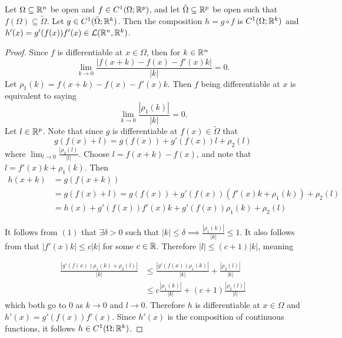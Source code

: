 \documentclass[../main.tex]{subfiles}
\begin{document}
\begin{theorem}
    \label{thm:chainrule}
    Let $\Omega \subseteq \mathbb{R}^n$ be open and $f \in C^1(\Omega; \mathbb{R}^p)$, and let $\tilde{\Omega} \subseteq \mathbb{R}^p$ be open such that $f(\Omega) \subseteq \tilde{\Omega}$. Let $g \in C^1(\tilde{\Omega}; \mathbb{R}^k)$. Then the composition $h = g \circ f$ is $C^1(\Omega; \mathbb{R}^k)$ and $h'(x) = g'(f(x)) f'(x) \in \mathcal{L}(\mathbb{R}^n, \mathbb{R}^k)$.
\end{theorem}

\begin{proof}
    Since $f$ is differentiable at $x \in \Omega$, then for $k \in \mathbb{R}^n$
    \[
        \lim_{k \to 0} \frac{|f(x+k) - f(x) - f'(x) k|}{|k|} = 0
    .\]
    Let $\rho_1(k) = f(x + k) - f(x) - f'(x) k$. Then $f$ being differentiable at $x$ is equivalent to saying
    \[
        \lim_{k \to 0} \frac{|\rho_1(k)|}{|k|} = 0 \tag{1}
    .\]
    Let $l \in \mathbb{R}^p$. Note that since $g$ is differentiable at $f(x) \in \tilde{\Omega}$ that
    \[
        g(f(x) + l) = g(f(x)) + g'(f(x)) l + \rho_2(l)
    \]
    where $\lim_{l \to 0} \frac{|\rho_2(l)}{|l|}$. Choose $l = f(x+k) - f(x)$, and note that $l = f'(x) k + \rho_1(k)$. Then
    \begin{align*}
        h(x+k) &= g(f(x+k)) \\
        &= g(f(x)+l) = g(f(x)) + g'(f(x)) (f'(x)k + \rho_1(k)) + \rho_2(l) \\
        &= h(x) + g'(f(x)) f'(x) k + g'(f(x)) \rho_1(k) + \rho_2(l)
    \end{align*}

    It follows from $(1)$ that $\exists \delta > 0$ such that $|k| \leq \delta \implies \frac{|\rho_1(k)|}{|k|} \leq 1$. It also follows from  that $|f'(x)k| \leq c |k|$ for some $c \in \mathbb{R}$. Therefore $|l| \leq (c+1)|k|$, meaning

    \begin{align*}
        \frac{|g'(f(x)) \rho_1(k) + \rho_2(l)|}{|k|} &\leq \frac{|g'(f(x)) \rho_1(k)|}{|k|} + \frac{|\rho_2(l)|}{|k|} \\
         &\leq c\frac{|\rho_1(k)|}{|k|} + (c + 1) \frac{|\rho_2(l)|}{|l|}
    \end{align*}
    which both go to $0$ as $k \to 0$ and $l \to 0$. Therefore $h$ is differentiable at $x \in \Omega$ and $h'(x) = g'(f(x)) f'(x)$. Since $h'(x)$ is the composition of continuous functions, it follows $h \in C^1(\Omega; \mathbb{R}^k)$.
\end{proof}
\end{document}

